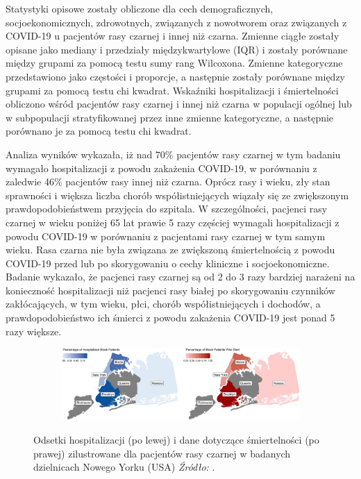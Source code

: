 \documentclass[polish, twoside, 12pt, a4paper]{article}
\theoremstyle{definition}
\theoremstyle{plain}
\theoremstyle{remark}
\begin{document}
Statystyki opisowe zostały obliczone dla cech demograficznych, socjoekonomicznych, zdrowotnych, związanych z nowotworem oraz związanych z COVID-19 u pacjentów rasy czarnej i innej niż czarna. Zmienne ciągłe zostały opisane jako mediany i przedziały międzykwartylowe (IQR) i zostały porównane między grupami za pomocą testu sumy rang Wilcoxona. Zmienne kategoryczne przedstawiono jako częstości i proporcje, a następnie zostały porównane między grupami za pomocą testu chi kwadrat. Wskaźniki hospitalizacji i śmiertelności obliczono wśród pacjentów rasy czarnej i innej niż czarna w populacji ogólnej lub w subpopulacji stratyfikowanej przez inne zmienne kategoryczne, a następnie porównano je za pomocą testu chi kwadrat.
	
Analiza wyników wykazała, iż nad 70\% pacjentów rasy czarnej w tym badaniu wymagało hospitalizacji z powodu zakażenia COVID-19, w porównaniu z zaledwie 46\% pacjentów rasy innej niż czarna. Oprócz rasy i wieku, zły stan sprawności i większa liczba chorób współistniejących wiązały się ze zwiększonym prawdopodobieństwem przyjęcia do szpitala. W szczególności, pacjenci rasy czarnej w wieku poniżej 65 lat prawie 5 razy częściej wymagali hospitalizacji z powodu COVID-19 w porównaniu z pacjentami rasy czarnej w tym samym wieku. Rasa czarna nie była związana ze zwiększoną śmiertelnością z powodu COVID-19 przed lub po skorygowaniu o cechy kliniczne i socjoekonomiczne. Badanie wykazało, że pacjenci rasy czarnej są od 2 do 3 razy bardziej narażeni na konieczność hospitalizacji niż pacjenci rasy białej po skorygowaniu czynników zakłócających, w tym wieku, płci, chorób współistniejących i dochodów, a prawdopodobieństwo ich śmierci z powodu zakażenia COVID-19 jest ponad 5 razy większe.


\begin{figure}[hbt]
  \centering

  \begin{subfigure}[t]{\textwidth}
    \includegraphics[width=15cm]{NY-racial-disparities.jpg}
  \end{subfigure}

  \captionsetup{margin=10pt,font=small,labelfont=bf,width=.8\textwidth}

  \caption{Odsetki hospitalizacji (po lewej) i dane dotyczące śmiertelności (po prawej) zilustrowane dla pacjentów rasy czarnej w badanych dzielnicach Nowego Yorku (USA) \textit{Źródło:} \cite{borghesi2020}.}\label{fig:xxx1}
\end{figure}
\end{document}
